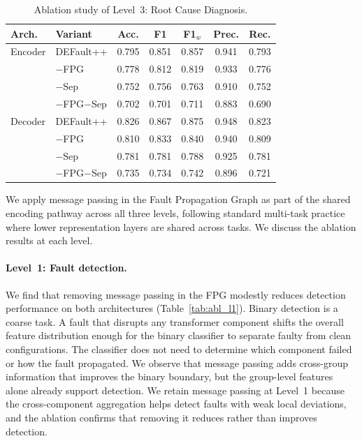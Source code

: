\begin{table}[t]
\centering
\caption{Ablation study of Level~3: Root Cause Diagnosis.}
\label{tab:abl_l3}
\small
\begin{tabular}{l l c c c c c}
\toprule
\textbf{Arch.} & \textbf{Variant} & \textbf{Acc.} & \textbf{F1} & \textbf{F1$_w$} & \textbf{Prec.} & \textbf{Rec.} \\
\midrule
Encoder & DEFault++ & 0.795 & 0.851 & 0.857 & 0.941 & 0.793 \\
        & $-$FPG & 0.778 & 0.812 & 0.819 & 0.933 & 0.776 \\
        & $-$Sep & 0.752 & 0.756 & 0.763 & 0.910 & 0.752 \\
        & $-$FPG$-$Sep & 0.702 & 0.701 & 0.711 & 0.883 & 0.690 \\
\midrule
Decoder & DEFault++ & 0.826 & 0.867 & 0.875 & 0.948 & 0.823 \\
        & $-$FPG & 0.810 & 0.833 & 0.840 & 0.940 & 0.809 \\
        & $-$Sep & 0.781 & 0.781 & 0.788 & 0.925 & 0.781 \\
        & $-$FPG$-$Sep & 0.735 & 0.734 & 0.742 & 0.896 & 0.721 \\
\bottomrule
\end{tabular}
\end{table}

We apply message passing in the Fault Propagation Graph as part of the shared encoding pathway across all three levels, following standard multi-task practice where lower representation layers are shared across tasks. We discuss the ablation results at each level.

\paragraph{Level~1: Fault detection.} We find that removing message passing in the FPG modestly reduces detection performance on both architectures (Table~\ref{tab:abl_l1}). Binary detection is a coarse task. A fault that disrupts any transformer component shifts the overall feature distribution enough for the binary classifier to separate faulty from clean configurations. The classifier does not need to determine which component failed or how the fault propagated. We observe that message passing adds cross-group information that improves the binary boundary, but the group-level features alone already support detection. We retain message passing at Level~1 because the cross-component aggregation helps detect faults with weak local deviations, and the ablation confirms that removing it reduces rather than improves detection.

